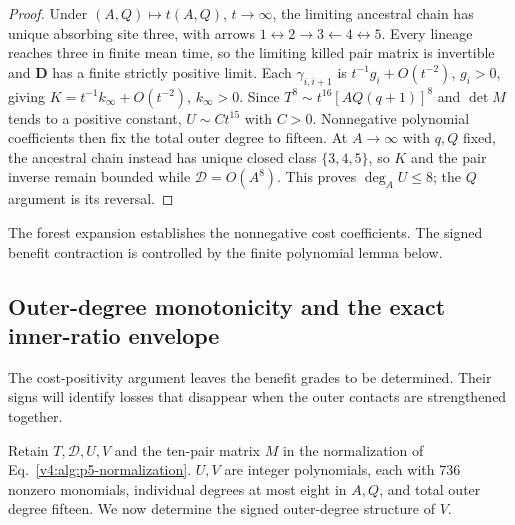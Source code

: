 \documentclass[aps,pre,reprint,amsmath,amssymb,longbibliography]{revtex4-2}
\begin{document}
\begin{proof}
Under $(A,Q)\mapsto t(A,Q)$, $t\to\infty$, the limiting ancestral chain
has unique absorbing site three, with arrows
$1\leftrightarrow2\to3\leftarrow4\leftrightarrow5$. Every lineage reaches
three in finite mean time, so the limiting killed pair matrix is invertible
and $\mathbf D$ has a finite strictly positive limit. Each $\gamma_{i,i+1}$ is
$t^{-1}g_i+O(t^{-2})$, $g_i>0$, giving
$K=t^{-1}k_\infty+O(t^{-2})$, $k_\infty>0$. Since
$T^8\sim t^{16}[AQ(q+1)]^8$ and $\det M$ tends to a positive constant,
$U\sim C t^{15}$ with $C>0$. Nonnegative polynomial coefficients then
fix the total outer degree to fifteen. At $A\to\infty$ with $q,Q$ fixed,
the ancestral chain instead has unique closed class $\{3,4,5\}$, so
$K$ and the pair inverse remain bounded while $\mathscr D=O(A^8)$.
This proves $\deg_AU\le8$; the $Q$ argument is its reversal.
\end{proof}

The forest expansion establishes the nonnegative cost coefficients.
The signed benefit contraction is controlled by the finite polynomial
lemma below.

\subsection{Outer-degree monotonicity and the exact inner-ratio envelope}
\label{v4:p5}
The cost-positivity argument leaves the benefit grades to be determined.
Their signs will identify losses that disappear when the outer contacts
are strengthened together.

Retain $T,\mathscr D,U,V$ and the ten-pair matrix $M$ in the
normalization of Eq.~\eqref{v4:alg:p5-normalization}.
\label{v4:eq:p5-normalization}
$U,V$ are integer polynomials, each with 736 nonzero monomials, individual
degrees at most eight in $A,Q$, and total outer degree fifteen.
We now determine the signed outer-degree structure of $V$.
\end{document}
